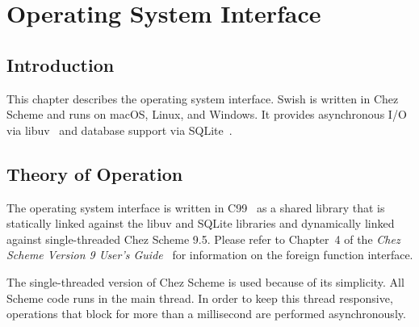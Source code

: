 %
%
%

\chapter {Operating System Interface}\label{chap:osi}

\section {Introduction}

This chapter describes the operating system interface. Swish is
written in Chez Scheme and runs on macOS, Linux, and Windows. It
provides asynchronous I/O via libuv~\cite{libuv} and database support
via SQLite~\cite{sqlite-guide}.

\section {Theory of Operation}

The operating system interface is written in C99~\cite{c99} as a
shared library that is statically linked against the libuv and SQLite
libraries and dynamically linked against single-threaded Chez Scheme
9.5.  Please refer to Chapter~4 of the \emph{Chez Scheme Version 9
  User's Guide}~\cite{chez-scheme-users-guide} for information on the
foreign function interface.

The single-threaded version of Chez Scheme is used because of its
simplicity. All Scheme code runs in the main thread. In order to keep
this thread responsive, operations that block for more than a
millisecond are performed asynchronously.

